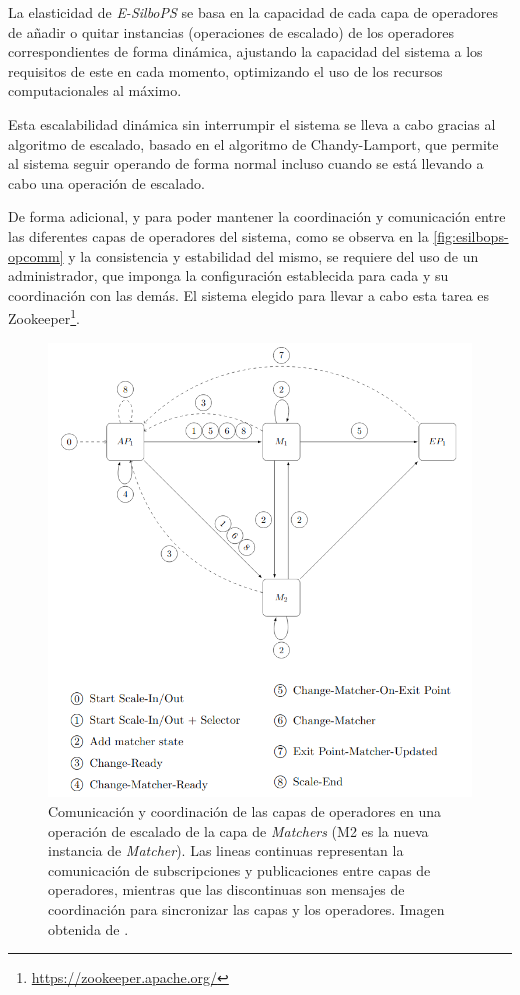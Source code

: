 La elasticidad de \textit{E-SilboPS} se basa en la capacidad de cada capa de operadores de añadir o quitar
instancias (operaciones de escalado) de los operadores correspondientes de forma dinámica, ajustando la
capacidad del sistema a los requisitos de este en cada momento, optimizando el uso de los recursos 
computacionales al máximo.

Esta escalabilidad dinámica sin interrumpir el sistema se lleva a cabo gracias al algoritmo de escalado, basado
en el algoritmo de Chandy-Lamport\cite{paper:chandy-lamport}, que permite al sistema seguir operando de
forma normal incluso cuando se está llevando a cabo una operación de escalado.

De forma adicional, y para poder mantener la coordinación y comunicación entre las diferentes capas de 
operadores del sistema, como se observa en la \autoref{fig:esilbops-opcomm} y la consistencia y estabilidad 
del mismo, se requiere del uso de un administrador, que imponga la configuración establecida para cada y su 
coordinación con las demás. El sistema elegido para llevar a cabo esta tarea es
Zookeeper\footnote{\href{https://zookeeper.apache.org/}{https://zookeeper.apache.org/}}.

\begin{figure}[htpb]
    \centering
    \includegraphics[width=\textwidth]{images/esilbops-opcomm.png}
    \caption{Comunicación y coordinación de las capas de operadores en una operación de escalado de la capa de \textit{Matchers} (M2 es la nueva instancia de \textit{Matcher}). Las lineas continuas representan la comunicación de subscripciones y publicaciones entre capas de operadores, mientras que las discontinuas son mensajes de coordinación para sincronizar las capas y los operadores. Imagen obtenida de \cite{thesis:tesisVictor}.}
    \label{fig:esilbops-opcomm}
\end{figure}

